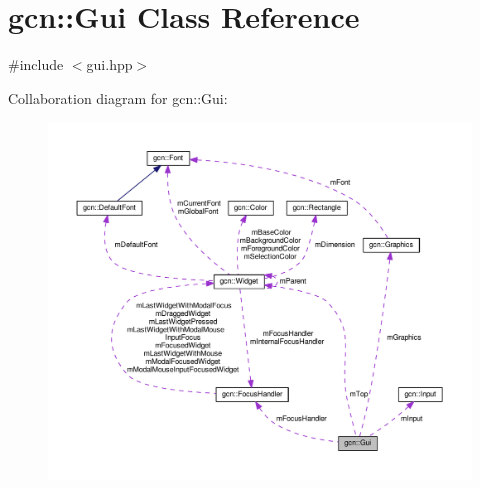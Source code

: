 \hypertarget{classgcn_1_1Gui}{}\section{gcn\+:\+:Gui Class Reference}
\label{classgcn_1_1Gui}


{\ttfamily \#include $<$gui.\+hpp$>$}



Collaboration diagram for gcn\+:\+:Gui\+:\nopagebreak
\begin{figure}[H]
\begin{center}
\leavevmode
\includegraphics[width=350pt]{classgcn_1_1Gui__coll__graph}
\end{center}
\end{figure}
